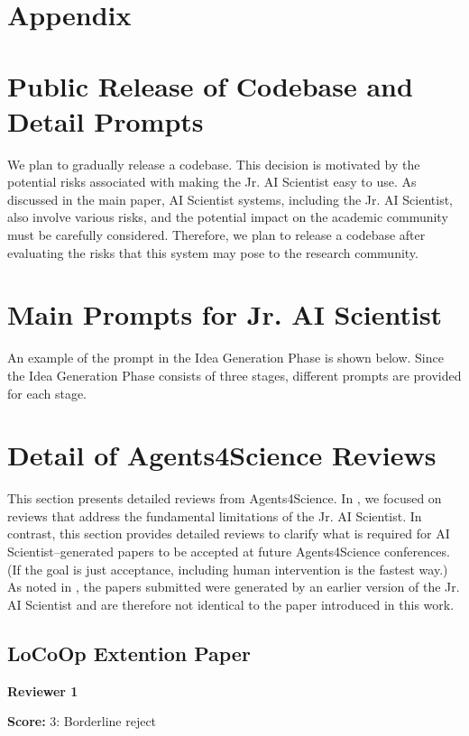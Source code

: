 \appendix
\section*{Appendix}

\section{Public Release of Codebase and Detail Prompts}
We plan to gradually release a codebase. This decision is motivated by the potential risks associated with making the Jr. AI Scientist easy to use. 
As discussed in the main paper, AI Scientist systems, including the Jr. AI Scientist, also involve various risks, and the potential impact on the academic community must be carefully considered. Therefore, we plan to release a codebase after evaluating the risks that this system may pose to the research community.


\section{Main Prompts for Jr. AI Scientist}
An example of the prompt in the Idea Generation Phase is shown below.
Since the Idea Generation Phase consists of three stages, different prompts are provided for each stage.



\section{Detail of Agents4Science Reviews}
This section presents detailed reviews from Agents4Science.
In , we focused on reviews that address the fundamental limitations of the Jr. AI Scientist.
In contrast, this section provides detailed reviews to clarify what is required for AI Scientist–generated papers to be accepted at future Agents4Science conferences. (If the goal is just acceptance, including human intervention is the fastest way.)
As noted in , the papers submitted were generated by an earlier version of the Jr. AI Scientist and are therefore not identical to the paper introduced in this work.

\subsection{LoCoOp Extention Paper}
\textbf{Reviewer 1}
\begin{tcolorbox}[
    colback=gray!5,
    colframe=gray!60,
    title=Review Score,
    fonttitle=\bfseries
]
\textbf{Score:} 3: Borderline reject
\end{tcolorbox}

